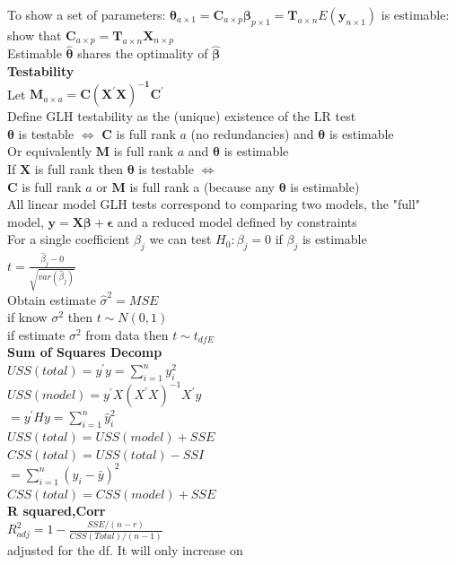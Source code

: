 \documentclass[10pt,landscape]{article}
\newcommand{\B}{\beta}
\newcommand{\sg}{\sigma}
\newcommand{\hb}{\hat{\beta}}
\newcommand{\sumn}{\sum_{i=1}^{n}}
\newcommand{\lra}{\Leftrightarrow}
\begin{document}
\begin{multicols*}{4}
To show a set of parameters:
$\bm{\theta}_{a\times 1}=\bm{C}_{a\times p}\bm{\B}_{p\times1}=\bm{T}_{a\times n}E(\bm{y}_{n\times 1})$ is estimable:\\
show that $\bm{C}_{a\times p}=\bm{T}_{a\times n}\bm{X}_{n \times p}$\\
Estimable $\bm{\hat{\theta}}$ shares the optimality of $\bm{\hb}$\\
\textbf{Testability}\\
Let $\bm{M}_{a\times a}=\bm{C(X^{'}X)^{-1}C^{'}}$\\
Define GLH testability as the (unique) existence of the LR test\\
$\bm{\theta}$ is testable $\lra$
$\bm{C}$ is full rank $a$ (no redundancies) and
$\bm{\theta}$ is estimable\\
Or equivalently
$\bm{M}$ is full rank $a$ and
$\bm{\theta}$ is estimable\\
If $\bm{X}$ is full rank then $\bm{\theta}$ is testable $\Leftrightarrow$\\
$\bm{C}$ is full rank $a$ or $\bm{M}$ is full rank a (because any $\bm{\theta}$ is estimable)\\
All linear model GLH tests correspond to comparing two models, the "full" model, $\bm{y}=\bm{X\B}+\bm{\epsilon}$ and a reduced model defined by constraints\\
For a single coefficient $\B_j$ we can test $H_0:\B_j=0$ if $\B_j$ is estimable\\
$t=\frac{\hb_j-0}{\sqrt{var(\hb_j)}}$\\
Obtain estimate $\hat{\sg}^2=MSE$\\
if know $\sigma^2$  then $t\sim N(0,1)$\\
if estimate $\sg^2$ from data then $t\sim t_{dfE}$\\
\textbf{Sum of Squares Decomp}\\
$USS(total)=y^{'}y=\sumn y_i^2$\\
$USS(model)=y^{'}X(X^{'}X)^{-1}X^{'}y$\\
$=y^{'}Hy=\sumn \hat{y}_i^2$\\
$USS(total)=USS(model)+SSE$\\
$CSS(total)=USS(total)-SSI$\\
$=\sumn(y_i-\bar{y})^2$\\
$CSS(total)=CSS(model)+SSE$\\
\textbf{R squared,Corr}\\
$R^2_{adj}=1-\frac{SSE/(n-r)}{CSS(Total)/(n-1)}$\\
 adjusted for the df. It will only increase on

\end{multicols*}
\end{document}
